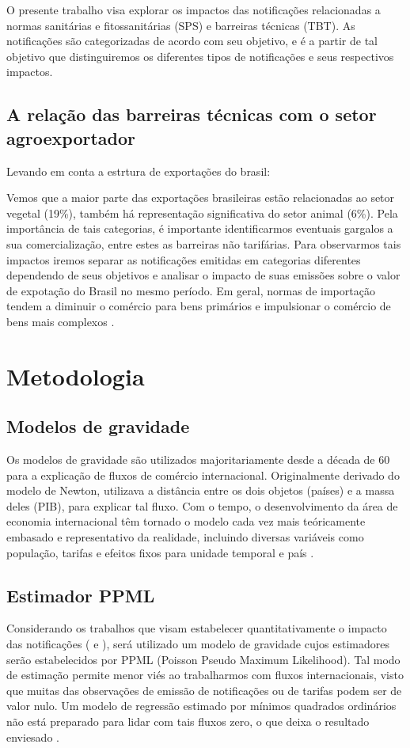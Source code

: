 \documentclass[12pt, a4paper]{article}
\begin{document}
O presente trabalho visa explorar os impactos das notificações relacionadas a normas sanitárias e fitossanitárias  (SPS) e barreiras técnicas  (TBT). As notificações são categorizadas de acordo com seu objetivo, e é a partir de tal objetivo que distinguiremos os diferentes tipos de notificações e seus respectivos impactos.

\subsection{A relação das barreiras técnicas com o setor agroexportador}

Levando em conta a estrtura de exportações do brasil:



Vemos que a maior parte das exportações brasileiras estão relacionadas ao setor vegetal (19\%), também há representação significativa do setor animal (6\%). Pela importância de tais categorias, é importante identificarmos eventuais gargalos a sua comercialização, entre estes as barreiras não tarifárias. Para observarmos  tais impactos iremos separar as notificações emitidas em categorias diferentes dependendo de seus objetivos e analisar o impacto de suas emissões sobre o valor de expotação do Brasil no mesmo período. Em geral, normas de importação tendem a diminuir o comércio para bens primários e impulsionar o comércio de bens mais complexos \cite{moenius}.

\section{Metodologia}
\subsection{Modelos de gravidade}

Os modelos de gravidade são utilizados majoritariamente desde a década de 60 para a explicação de fluxos de comércio internacional. Originalmente derivado do modelo de Newton, utilizava a distância entre os dois objetos (países) e a massa deles (PIB), para explicar tal fluxo. Com o tempo, o desenvolvimento da área de economia internacional têm tornado o modelo cada vez mais teóricamente embasado e representativo da realidade, incluindo diversas variáveis como população, tarifas e efeitos fixos para unidade temporal e país \cite{nascimento2013evoluccao}.

\subsection{Estimador PPML}
Considerando os trabalhos que visam estabelecer quantitativamente o impacto das notificações (\cite{impactosprodquimicos} e \cite{ALMEIDA2014}), será utilizado um modelo de gravidade cujos estimadores serão estabelecidos por PPML (Poisson Pseudo Maximum Likelihood). Tal modo de estimação permite menor viés ao trabalharmos com fluxos internacionais, visto que muitas das observações de emissão de notificações ou de tarifas podem ser de valor nulo. Um modelo de regressão estimado por mínimos quadrados ordinários não está preparado para lidar com tais fluxos zero, o que deixa o resultado enviesado \cite{Log_Of_Gravity}.
\end{document}
